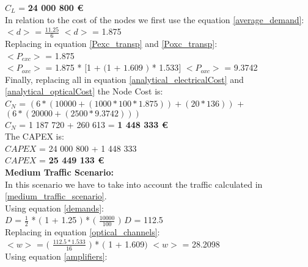 $C_L$ = \textbf{24 000 800 \euro}\\

In relation to the cost of the nodes we first use the equation \ref{average_demand}:\\

$<d>$ = $\frac{11.25}{6}$ \qquad \qquad $<d>$ = 1.875\\

Replacing in equation \ref{Pexc_transp} and \ref{Poxc_transp}:\\

$<P_{exc}>$ = 1.875\\

$<P_{oxc}>$ = 1.875 * $[$1 + $($1 + $1.609$ $)$ * 1.533$]$ \qquad \quad $<P_{oxc}>$ = 9.3742 \\

Finally, replacing all in equation \ref{analytical_electricalCost} and \ref{analytical_opticalCost} the Node Cost is:\\

$C_N$ = $\left(6 * (10 000 + (1 000 * 100 * 1.875)) + (20 * 136)\right)$ + $\left(6*(20 000 + (2 500 * 9.3742 ) ) \right)$\\

$C_N$ = 1 187 720 + 260 613 = \textbf{1 448 333 \euro}\\

The CAPEX is:\\
$CAPEX$ = 24 000 800 + 1 448 333\\

$CAPEX$ = \textbf{25 449 133 \euro}\\


\textbf{Medium Traffic Scenario:}\\
In this scenario we have to take into account the traffic calculated in \ref{medium_traffic_scenario}.\\

Using equation \ref{demands}:\\

$D$ = $\frac{1}{2}$ * $($ 1 + 1.25 $)$ * $($ $\frac{10000}{100}$ $)$ \qquad \qquad $D$ = 112.5\\

Replacing in equation \ref{optical_channels}:\\

$<w>$ = $($ $\frac{112.5 * 1.533}{16}$ $)$ * $($ 1 + 1.609$)$ \qquad \qquad $<w>$ = 28.2098\\

Using equation \ref{amplifiers}:\\

